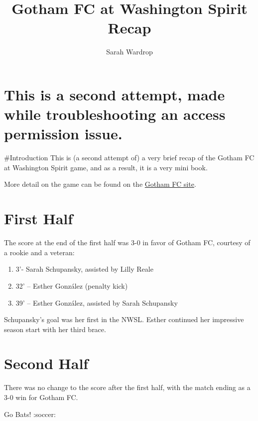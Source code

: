 \documentclass[
  openany]{book}
\title{Gotham FC at Washington Spirit Recap}
\author{Sarah Wardrop}
\date{}
\providecommand{\tightlist}{%
  \setlength{\itemsep}{0pt}\setlength{\parskip}{0pt}}
\begin{document}
\maketitle

{
\setcounter{tocdepth}{1}
\tableofcontents
}
\chapter{This is a second attempt, made while troubleshooting an access permission issue.}\label{this-is-a-second-attempt-made-while-troubleshooting-an-access-permission-issue.}

\#Introduction
This is (a second attempt of) a very brief recap of the Gotham FC at Washington Spirit game, and as a result, it is a very mini book.

More detail on the game can be found on the \href{https://www.gothamfc.com/news/gotham-fc-caps-road-swing-with-victory-over-washington-spirit}{Gotham FC site}.

\chapter{First Half}\label{first-half}

The score at the end of the first half was 3-0 in favor of Gotham FC, courtesy of a rookie and a veteran:

\begin{enumerate}
\def\labelenumi{\arabic{enumi}.}
\tightlist
\item
  3'- Sarah Schupansky, assisted by Lilly Reale
\item
  32' -- Esther González (penalty kick)
\item
  39' -- Esther González, assisted by Sarah Schupansky
\end{enumerate}

Schupansky's goal was her first in the NWSL. Esther continued her impressive season start with her third brace.

\chapter{Second Half}\label{second-half}

There was no change to the score after the first half, with the match ending as a 3-0 win for Gotham FC.

Go Bats! :soccer:
\end{document}
